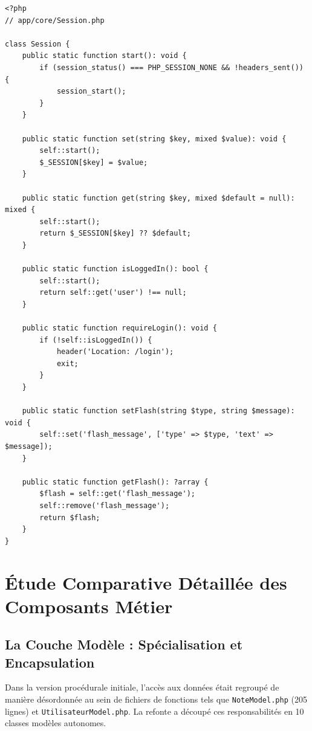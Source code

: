 \documentclass[11pt,a4paper,oneside]{report}
\begin{document}
\begin{lstlisting}[language=PHP8, caption={Gestion des sessions statiques et messages Flash}]
<?php
// app/core/Session.php

class Session {
    public static function start(): void {
        if (session_status() === PHP_SESSION_NONE && !headers_sent()) {
            session_start();
        }
    }

    public static function set(string $key, mixed $value): void {
        self::start();
        $_SESSION[$key] = $value;
    }

    public static function get(string $key, mixed $default = null): mixed {
        self::start();
        return $_SESSION[$key] ?? $default;
    }

    public static function isLoggedIn(): bool {
        self::start();
        return self::get('user') !== null;
    }

    public static function requireLogin(): void {
        if (!self::isLoggedIn()) {
            header('Location: /login');
            exit;
        }
    }

    public static function setFlash(string $type, string $message): void {
        self::set('flash_message', ['type' => $type, 'text' => $message]);
    }

    public static function getFlash(): ?array {
        $flash = self::get('flash_message');
        self::remove('flash_message');
        return $flash;
    }
}
\end{lstlisting}

\chapter{Étude Comparative Détaillée des Composants Métier}
\label{chap:composants}

\section{La Couche Modèle : Spécialisation et Encapsulation}

Dans la version procédurale initiale, l'accès aux données était regroupé de manière désordonnée au sein de fichiers de fonctions tels que \texttt{NoteModel.php} (205 lignes) et \texttt{UtilisateurModel.php}. La refonte a découpé ces responsabilités en 10 classes modèles autonomes.
\end{document}
